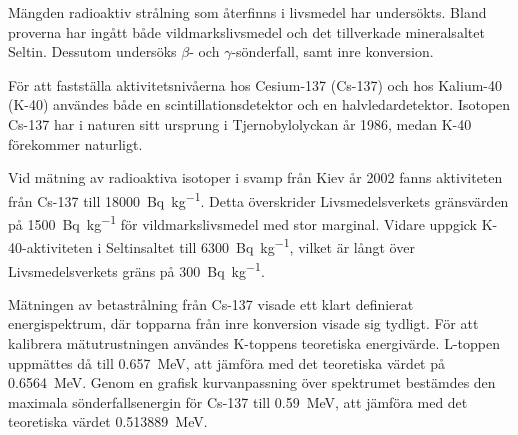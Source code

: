 Mängden radioaktiv strålning som återfinns i livsmedel har undersökts. Bland
proverna har ingått både vildmarkslivsmedel och det tillverkade mineralsaltet
Seltin. Dessutom undersöks $\beta$- och $\gamma$-sönderfall, samt inre
konversion.

För att fastställa aktivitetsnivåerna hos Cesium-137 (Cs-137) och hos Kalium-40
(K-40) användes både en scintillationsdetektor och en halvledardetektor.
Isotopen Cs-137 har i naturen sitt ursprung i Tjernobylolyckan år 1986, medan
K-40 förekommer naturligt.

Vid mätning av radioaktiva isotoper i svamp från Kiev år 2002 fanns
aktiviteten från Cs-137 till \qty{18000}{\becquerel\per\kg}. Detta
överskrider Livsmedelsverkets gränsvärden på \qty{1500}{\becquerel\per\kg} för
vildmarkslivsmedel med stor marginal. Vidare uppgick K-40-aktiviteten i
Seltinsaltet till \qty{6300}{\becquerel\per\kg}, vilket är långt över
Livsmedelsverkets gräns på \qty{300}{\becquerel\per\kg}.

Mätningen av betastrålning från Cs-137 visade ett klart definierat
energispektrum, där topparna från inre konversion visade sig tydligt. För att
kalibrera mätutrustningen användes K-toppens teoretiska energivärde. L-toppen
uppmättes då till \qty{0.657}{\MeV}, att jämföra med det teoretiska värdet på
\qty{0.6564}{\MeV}. Genom en grafisk kurvanpassning över spektrumet bestämdes
den maximala sönderfallsenergin för Cs-137 till \qty{0.59}{\MeV}, att jämföra
med det teoretiska värdet \qty{0.513889}{\MeV}.
